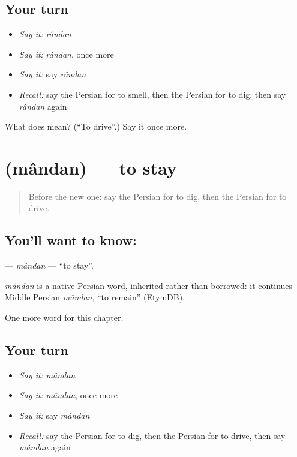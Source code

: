 \subsection*{Your turn}
\begin{itemize}
\raggedright
  \item \emph{Say it:} \emph{rândan}
  \item \emph{Say it:} \emph{rândan}, once more
  \item \emph{Say it:} say \emph{rândan}
  \item \emph{Recall:} say the Persian for to smell, then the Persian for to dig, then say \emph{rândan} again
\end{itemize}

\begin{tcolorbox}[breakable,colback=teal!4,colframe=teal!35!black,title={Before you move on}]
What does  mean? (\textquotedblleft{}To drive\textquotedblright{}.) Say it once more.
\end{tcolorbox}
\section[\texorpdfstring{\fa{ماندن} (mândan)}{ماندن (mândan)}]{ (mândan) — to stay}

\label{lesson:FA-C135-mandan}



\begin{quote}
Before the new one: say the Persian for to dig, then the Persian for to drive.
\end{quote}

\subsection*{You'll want to know: }
\textbf{} — \emph{mândan} — \textquotedblleft{}to stay\textquotedblright{}.

\begin{cousinweb}
\emph{mândan} is a native Persian word, inherited rather than borrowed: it continues Middle Persian \emph{māndan}, \textquotedblleft{}to remain\textquotedblright{} (EtymDB).
\end{cousinweb}

\begin{grammarlens}[title={What you've built}]
One more word for this chapter.
\end{grammarlens}

\subsection*{Your turn}
\begin{itemize}
\raggedright
  \item \emph{Say it:} \emph{mândan}
  \item \emph{Say it:} \emph{mândan}, once more
  \item \emph{Say it:} say \emph{mândan}
  \item \emph{Recall:} say the Persian for to dig, then the Persian for to drive, then say \emph{mândan} again
\end{itemize}

